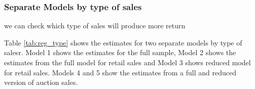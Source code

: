 \documentclass[11pt]{paper}
\begin{document}
\subsubsection{Separate Models by type of sales}
we can check which type of sales will produce more return 
 
Table \ref{tab:reg_type}
shows the estimates for two separate models
by type of salesr.
%
Model 1 shows the estimates for 
the full sample,
Model 2 shows the estimates from the full model for 
retail sales
and Model 3
shows reduced model for retail sales. 
% 
Models 4 and 5 show the estimates from a full and reduced version of auction sales.
 
% 




\clearpage


\end{document}

